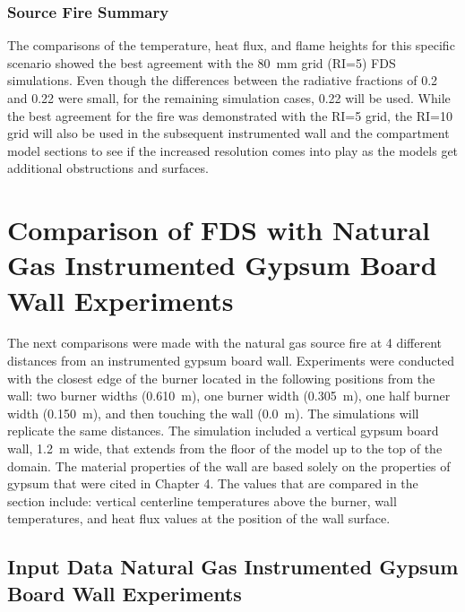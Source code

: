 \documentclass[twoside]{uocthesis}
\begin{document}
{\subsubsection{Source Fire Summary}

The comparisons of the temperature, heat flux, and flame heights for this specific scenario showed the best agreement with the 80~mm grid (RI=5) FDS simulations.  Even though the differences between the radiative fractions of 0.2 and 0.22 were small, for the remaining simulation cases, 0.22 will be used.  While the best agreement for the fire was demonstrated with the RI=5 grid, the RI=10 grid will also be used in the subsequent instrumented wall and the compartment model sections to see if the increased resolution comes into play as the models get additional obstructions and surfaces.  

\section{Comparison of FDS with Natural Gas Instrumented Gypsum Board Wall Experiments}

The next comparisons were made with the natural gas source fire at 4 different distances from an instrumented gypsum board wall.  Experiments were conducted with the closest edge of the burner located in the following positions from the wall: two burner widths (0.610~m), one burner width (0.305~m), one half burner width (0.150~m), and then touching the wall (0.0~m).  The simulations will replicate the same distances.  The simulation included a vertical gypsum board wall, 1.2~m wide, that extends from the floor of the model up to the top of the domain.  The material properties of the wall are based solely on the properties of gypsum that were cited in Chapter 4.  The values that are compared in the section include: vertical centerline temperatures above the burner, wall temperatures, and heat flux values at the position of the wall surface.    
 
\subsection{Input Data Natural Gas Instrumented Gypsum Board Wall Experiments}

}
\end{document}
